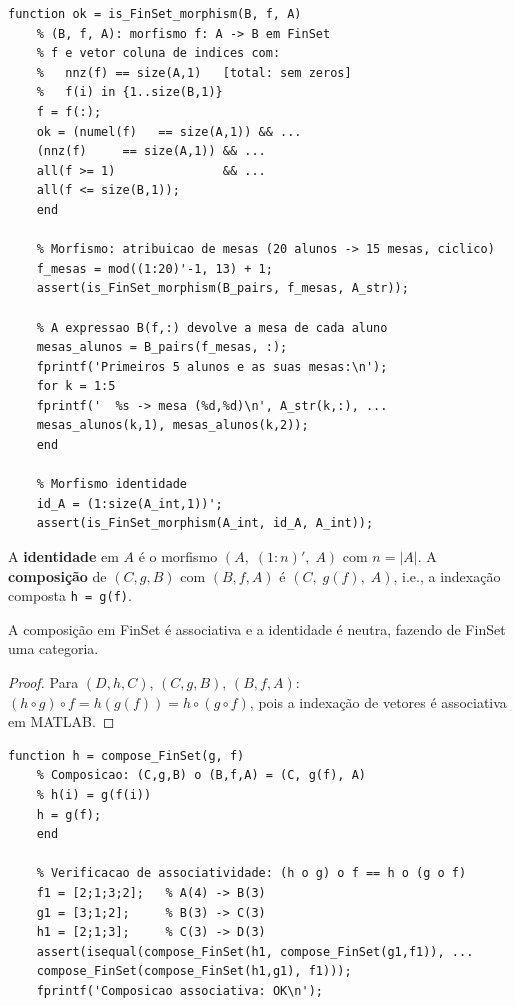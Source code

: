 \begin{lstlisting}[style=matlab, caption={Validação de um morfismo em FinSet}]
	function ok = is_FinSet_morphism(B, f, A)
	% (B, f, A): morfismo f: A -> B em FinSet
	% f e vetor coluna de indices com:
	%   nnz(f) == size(A,1)   [total: sem zeros]
	%   f(i) in {1..size(B,1)}
	f = f(:);
	ok = (numel(f)   == size(A,1)) && ...
	(nnz(f)     == size(A,1)) && ...
	all(f >= 1)               && ...
	all(f <= size(B,1));
	end
	
	% Morfismo: atribuicao de mesas (20 alunos -> 15 mesas, ciclico)
	f_mesas = mod((1:20)'-1, 13) + 1;
	assert(is_FinSet_morphism(B_pairs, f_mesas, A_str));
	
	% A expressao B(f,:) devolve a mesa de cada aluno
	mesas_alunos = B_pairs(f_mesas, :);
	fprintf('Primeiros 5 alunos e as suas mesas:\n');
	for k = 1:5
	fprintf('  %s -> mesa (%d,%d)\n', A_str(k,:), ...
	mesas_alunos(k,1), mesas_alunos(k,2));
	end
	
	% Morfismo identidade
	id_A = (1:size(A_int,1))';
	assert(is_FinSet_morphism(A_int, id_A, A_int));
\end{lstlisting}

\begin{definition}
	A \textbf{identidade} em $A$ é o morfismo $(A,\;(1:n)',\;A)$
	com $n = |A|$.
	A \textbf{composição} de $(C,g,B)$ com $(B,f,A)$ é
	$(C,\; g(f),\; A)$, i.e., a indexação composta \texttt{h = g(f)}.
\end{definition}

\begin{proposition}
	A composição em FinSet é associativa e a identidade é neutra,
	fazendo de FinSet uma categoria.
\end{proposition}
\begin{proof}
	Para $(D,h,C)$, $(C,g,B)$, $(B,f,A)$:
	$(h \circ g) \circ f = h(g(f)) = h \circ (g \circ f)$,
	pois a indexação de vetores é associativa em MATLAB.
\end{proof}

\begin{lstlisting}[style=matlab, caption={Composição de morfismos e verificação de associatividade}]
	function h = compose_FinSet(g, f)
	% Composicao: (C,g,B) o (B,f,A) = (C, g(f), A)
	% h(i) = g(f(i))
	h = g(f);
	end
	
	% Verificacao de associatividade: (h o g) o f == h o (g o f)
	f1 = [2;1;3;2];   % A(4) -> B(3)
	g1 = [3;1;2];     % B(3) -> C(3)
	h1 = [2;1;3];     % C(3) -> D(3)
	assert(isequal(compose_FinSet(h1, compose_FinSet(g1,f1)), ...
	compose_FinSet(compose_FinSet(h1,g1), f1)));
	fprintf('Composicao associativa: OK\n');
\end{lstlisting}


